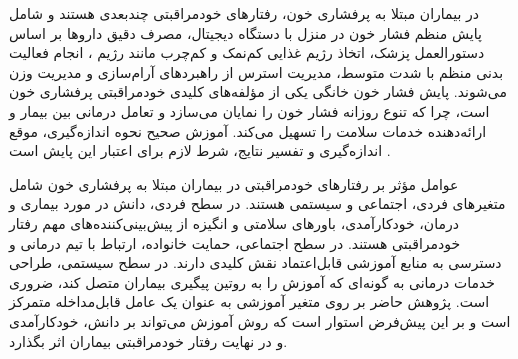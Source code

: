 در بیماران مبتلا به پرفشاری خون، رفتارهای خودمراقبتی چندبعدی هستند و شامل پایش منظم فشار خون در منزل با دستگاه دیجیتال، مصرف دقیق داروها بر اساس دستورالعمل پزشک، اتخاذ رژیم غذایی کم‌نمک و کم‌چرب مانند رژیم ، انجام فعالیت بدنی منظم با شدت متوسط، مدیریت استرس از راهبردهای آرام‌سازی و مدیریت وزن می‌شوند. پایش فشار خون خانگی یکی از مؤلفه‌های کلیدی خودمراقبتی پرفشاری خون است، چرا که تنوع روزانه فشار خون را نمایان می‌سازد و تعامل درمانی بین بیمار و ارائه‌دهنده خدمات سلامت را تسهیل می‌کند. آموزش صحیح نحوه اندازه‌گیری، موقع اندازه‌گیری و تفسیر نتایج، شرط لازم برای اعتبار این پایش است \cite{appel2006dash,han2014hscp}.
\par
عوامل مؤثر بر رفتارهای خودمراقبتی در بیماران مبتلا به پرفشاری خون شامل متغیرهای فردی، اجتماعی و سیستمی هستند. در سطح فردی، دانش در مورد بیماری و درمان، خودکارآمدی، باورهای سلامتی و انگیزه از پیش‌بینی‌کننده‌های مهم رفتار خودمراقبتی هستند. در سطح اجتماعی، حمایت خانواده، ارتباط با تیم درمانی و دسترسی به منابع آموزشی قابل‌اعتماد نقش کلیدی دارند. در سطح سیستمی، طراحی خدمات درمانی به گونه‌ای که آموزش را به روتین پیگیری بیماران متصل کند، ضروری است. پژوهش حاضر بر روی متغیر آموزشی به عنوان یک عامل قابل‌مداخله متمرکز است و بر این پیش‌فرض استوار است که روش آموزش می‌تواند بر دانش، خودکارآمدی و در نهایت رفتار خودمراقبتی بیماران اثر بگذارد.

